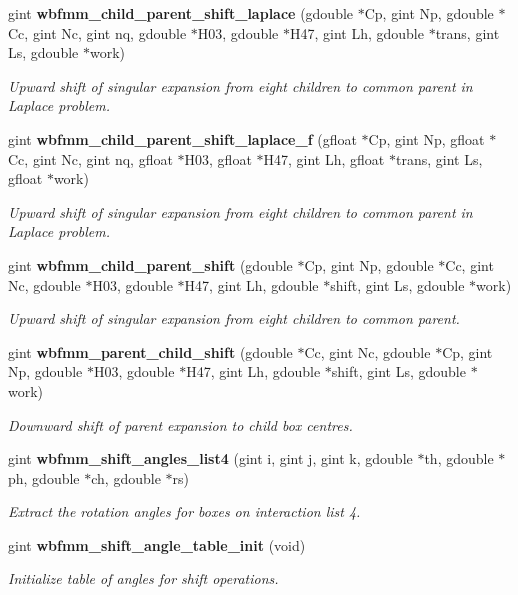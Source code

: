\begin{DoxyCompactItemize}
gint {\bf wbfmm\+\_\+child\+\_\+parent\+\_\+shift\+\_\+laplace} (gdouble $\ast$Cp, gint Np, gdouble $\ast$Cc, gint Nc, gint nq, gdouble $\ast$H03, gdouble $\ast$H47, gint Lh, gdouble $\ast$trans, gint Ls, gdouble $\ast$work)
\begin{DoxyCompactList}\small\item\em Upward shift of singular expansion from eight children to common parent in Laplace problem. \end{DoxyCompactList}\item 
gint {\bf wbfmm\+\_\+child\+\_\+parent\+\_\+shift\+\_\+laplace\+\_\+f} (gfloat $\ast$Cp, gint Np, gfloat $\ast$Cc, gint Nc, gint nq, gfloat $\ast$H03, gfloat $\ast$H47, gint Lh, gfloat $\ast$trans, gint Ls, gfloat $\ast$work)
\begin{DoxyCompactList}\small\item\em Upward shift of singular expansion from eight children to common parent in Laplace problem. \end{DoxyCompactList}\item 
gint {\bf wbfmm\+\_\+child\+\_\+parent\+\_\+shift} (gdouble $\ast$Cp, gint Np, gdouble $\ast$Cc, gint Nc, gdouble $\ast$H03, gdouble $\ast$H47, gint Lh, gdouble $\ast$shift, gint Ls, gdouble $\ast$work)
\begin{DoxyCompactList}\small\item\em Upward shift of singular expansion from eight children to common parent. \end{DoxyCompactList}\item 
gint {\bf wbfmm\+\_\+parent\+\_\+child\+\_\+shift} (gdouble $\ast$Cc, gint Nc, gdouble $\ast$Cp, gint Np, gdouble $\ast$H03, gdouble $\ast$H47, gint Lh, gdouble $\ast$shift, gint Ls, gdouble $\ast$work)
\begin{DoxyCompactList}\small\item\em Downward shift of parent expansion to child box centres. \end{DoxyCompactList}\item 
gint {\bf wbfmm\+\_\+shift\+\_\+angles\+\_\+list4} (gint i, gint j, gint k, gdouble $\ast$th, gdouble $\ast$ph, gdouble $\ast$ch, gdouble $\ast$rs)
\begin{DoxyCompactList}\small\item\em Extract the rotation angles for boxes on interaction list 4. \end{DoxyCompactList}\item 
gint {\bf wbfmm\+\_\+shift\+\_\+angle\+\_\+table\+\_\+init} (void)
\begin{DoxyCompactList}\small\item\em Initialize table of angles for shift operations. \end{DoxyCompactList}\item 

\end{DoxyCompactItemize}
